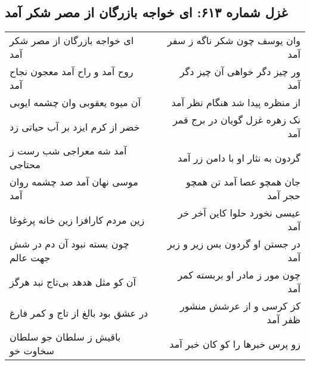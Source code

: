 \begin{center}
\section*{غزل شماره ۶۱۳: ای خواجه بازرگان از مصر شکر آمد}
\label{sec:0613}
\begin{longtable}{l p{0.5cm} r}
ای خواجه بازرگان از مصر شکر آمد
&&
وان یوسف چون شکر ناگه ز سفر آمد
\\
روح آمد و راح آمد معجون نجاح آمد
&&
ور چیز دگر خواهی آن چیز دگر آمد
\\
آن میوه یعقوبی وان چشمه ایوبی
&&
از منظره پیدا شد هنگام نظر آمد
\\
خضر از کرم ایزد بر آب حیاتی زد
&&
نک زهره غزل گویان در برج قمر آمد
\\
آمد شه معراجی شب رست ز محتاجی
&&
گردون به نثار او با دامن زر آمد
\\
موسی نهان آمد صد چشمه روان آمد
&&
جان همچو عصا آمد تن همچو حجر آمد
\\
زین مردم کارافزا زین خانه پرغوغا
&&
عیسی نخورد حلوا کاین آخر خر آمد
\\
چون بسته نبود آن دم در شش جهت عالم
&&
در جستن او گردون بس زیر و زبر آمد
\\
آن کو مثل هدهد بی‌تاج نبد هرگز
&&
چون مور ز مادر او بربسته کمر آمد
\\
در عشق بود بالغ از تاج و کمر فارغ
&&
کز کرسی و از عرشش منشور ظفر آمد
\\
باقیش ز سلطان جو سلطان سخاوت خو
&&
زو پرس خبرها را کو کان خبر آمد
\\
\end{longtable}
\end{center}
